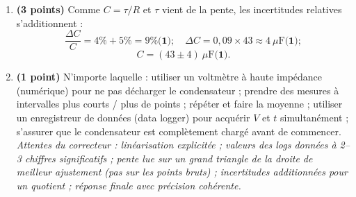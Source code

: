 \documentclass[11pt]{article}
\begin{document}
\begin{corrige}
\begin{enumerate}
\[ \text{pente} = \frac{-0,51 - 2,48}{60 - 0} = -5,0\times10^{-2}\ \mathrm{s^{-1}} \textbf{(2 points pour grand triangle et valeur)}. \]
$\tau = -\dfrac{1}{\text{pente}} = \dfrac{1}{0,050} = 20\ \mathrm{s}$ \textbf{(1)}.\\
$C = \dfrac{\tau}{R} = \dfrac{20}{470\times10^{3}} = 4,3\times10^{-5}\ \mathrm{F} = 43\ \mu\mathrm{F}$ \textbf{(1)}.
\item \textbf{(3 points)} Comme $C = \tau/R$ et $\tau$ vient de la pente, les incertitudes relatives s'additionnent :
\[ \frac{\Delta C}{C} = 4\% + 5\% = 9\% \textbf{(1)}; \quad \Delta C = 0,09 \times 43 \approx 4\ \mu\mathrm{F} \textbf{(1)}; \]
\[ C = (43 \pm 4)\ \mu\mathrm{F} \textbf{(1)}. \]
\item \textbf{(1 point)} N'importe laquelle : utiliser un voltmètre à haute impédance (numérique) pour ne pas décharger le condensateur ; prendre des mesures à intervalles plus courts / plus de points ; répéter et faire la moyenne ; utiliser un enregistreur de données (data logger) pour acquérir $V$ et $t$ simultanément ; s'assurer que le condensateur est complètement chargé avant de commencer.\\
\emph{Attentes du correcteur : linéarisation explicitée ; valeurs des logs données à 2--3 chiffres significatifs ; pente lue sur un grand triangle de la droite de meilleur ajustement (pas sur les points bruts) ; incertitudes additionnées pour un quotient ; réponse finale avec précision cohérente.}
\end{enumerate}
\end{corrige}
\end{document}
